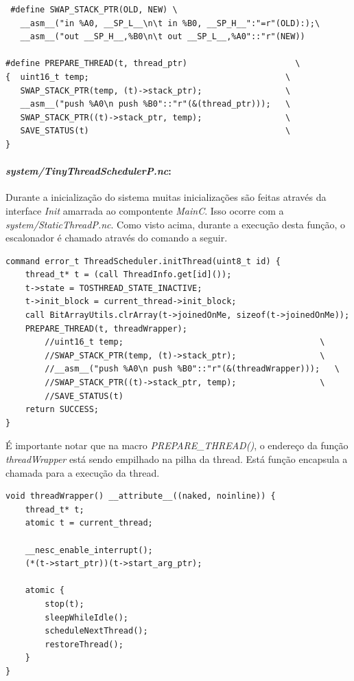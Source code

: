 \begin{lstlisting}
 #define SWAP_STACK_PTR(OLD, NEW) \
   __asm__("in %A0, __SP_L__\n\t in %B0, __SP_H__":"=r"(OLD):);\
   __asm__("out __SP_H__,%B0\n\t out __SP_L__,%A0"::"r"(NEW))
 
#define PREPARE_THREAD(t, thread_ptr)                      \
{  uint16_t temp;                                        \
   SWAP_STACK_PTR(temp, (t)->stack_ptr);                 \
   __asm__("push %A0\n push %B0"::"r"(&(thread_ptr)));   \
   SWAP_STACK_PTR((t)->stack_ptr, temp);                 \
   SAVE_STATUS(t)                                        \
}
\end{lstlisting}

\paragraph{\textit{system/TinyThreadSchedulerP.nc}:}
Durante a inicialização do sistema muitas inicializações são feitas através da interface \textit{Init} amarrada ao
compontente \textit{MainC}. Isso ocorre com a \textit{system/StaticThreadP.nc}. Como visto acima, durante a execução
desta função, o escalonador é chamado através do comando a seguir.
\begin{lstlisting}
command error_t ThreadScheduler.initThread(uint8_t id) {
    thread_t* t = (call ThreadInfo.get[id]());
    t->state = TOSTHREAD_STATE_INACTIVE;
    t->init_block = current_thread->init_block;
    call BitArrayUtils.clrArray(t->joinedOnMe, sizeof(t->joinedOnMe));
    PREPARE_THREAD(t, threadWrapper);
        //uint16_t temp;                                        \
        //SWAP_STACK_PTR(temp, (t)->stack_ptr);                 \
        //__asm__("push %A0\n push %B0"::"r"(&(threadWrapper)));   \
        //SWAP_STACK_PTR((t)->stack_ptr, temp);                 \
        //SAVE_STATUS(t)   
    return SUCCESS;
}
\end{lstlisting}
É importante notar que na macro \textit{PREPARE\_THREAD()}, o endereço da função \textit{threadWrapper} está sendo
empilhado na pilha da thread. Está função encapsula a chamada para a execução da thread.
\begin{lstlisting}
void threadWrapper() __attribute__((naked, noinline)) {
    thread_t* t;
    atomic t = current_thread;

    __nesc_enable_interrupt();
    (*(t->start_ptr))(t->start_arg_ptr);

    atomic {
        stop(t);
        sleepWhileIdle();
        scheduleNextThread();
        restoreThread();
    }
}
\end{lstlisting}

